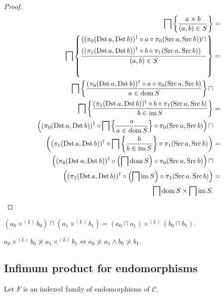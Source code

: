 \begin{proof}
  ~
  \begin{align*}
  \bigsqcap \left\{ \frac{ a \times b }{ (a , b) \in S }\right\} & = \\
  \bigsqcap \left\{ \frac{ \begin{aligned}&((\pi_0(\operatorname{Dst} a , \operatorname{Dst}
  b))^{\dagger} \circ a \circ \pi_0(\operatorname{Src} a , \operatorname{Src} b)) \sqcap\\
  &((\pi_1(\operatorname{Dst} a , \operatorname{Dst} b))^{\dagger} \circ b \circ
  \pi_1(\operatorname{Src} a , \operatorname{Src} b))\end{aligned} }{ (a , b) \in S }\right\} & = \\
  \bigsqcap \left\{ \frac{ (\pi_0(\operatorname{Dst} a , \operatorname{Dst}
  b))^{\dagger} \circ a \circ \pi_0(\operatorname{Src} a , \operatorname{Src} b)
  }{ a \in \operatorname{dom} S }\right\} \sqcap\\
  \bigsqcap
  \left\{ \frac{ (\pi_1(\operatorname{Dst} a , \operatorname{Dst} b))^{\dagger} \circ b \circ
  \pi_1(\operatorname{Src} a , \operatorname{Src} b) }{ b \in \operatorname{im} S }\right\} & = \\
  \left( (\pi_0(\operatorname{Dst} a , \operatorname{Dst}
  b))^{\dagger} \circ \bigsqcap \left\{ \frac{ a }{ a \in
  \operatorname{dom} S }\right\} \circ \pi_0(\operatorname{Src} a , \operatorname{Src} b) \right)
  \sqcap\\ \left( (\pi_1(\operatorname{Dst} a , \operatorname{Dst} b))^{\dagger} \circ
  \bigsqcap \left\{ \frac{ b }{ b \in \operatorname{im} S }\right\}
  \circ \pi_1(\operatorname{Src} a , \operatorname{Src} b) \right) & = \\
  \left(
  (\pi_0(\operatorname{Dst} a , \operatorname{Dst} b))^{\dagger} \circ \left( \bigsqcap
  \operatorname{dom} S \right) \circ \pi_0(\operatorname{Src} a , \operatorname{Src} b) \right)
  \sqcap\\ \left( (\pi_1(\operatorname{Dst} a , \operatorname{Dst} b))^{\dagger} \circ \left(
  \bigsqcap \operatorname{im} S \right) \circ \pi_1(\operatorname{Src} a , \operatorname{Src} b)
  \right) & = \\
  \bigsqcap \operatorname{dom} S \times \bigsqcap \operatorname{im} S.
  \end{align*}
\end{proof}

\begin{cor}
  $(a_0 \times^{(L)} b_0) \sqcap (a_1 \times^{(L)} b_1) = (a_0 \sqcap a_1)
  \times^{(L)} (b_0 \sqcap b_1)$.
\end{cor}

\begin{cor}
  $a_0 \times^{(L)} b_0 \nasymp a_1 \times^{(L)} b_1 \Leftrightarrow a_0
  \nasymp a_1 \wedge b_0 \nasymp b_1$.
\end{cor}

\subsection{Infimum product for endomorphisms}

Let $F$ is an indexed family of endomorphisms of $\mathcal{C}$.

